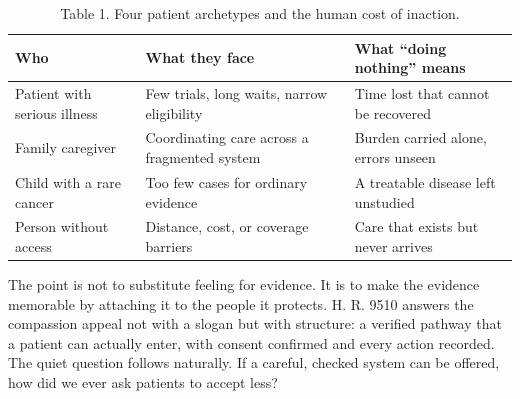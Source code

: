 \begin{table}[H]
\footnotesize
\begin{tabularx}{\textwidth}{@{}L{3.2cm} Y L{4.2cm}@{}}
\toprule
\textbf{Who} & \textbf{What they face} & \textbf{What ``doing nothing'' means}\\
\midrule
Patient with serious illness & Few trials, long waits, narrow eligibility & Time lost that cannot be recovered\\
Family caregiver & Coordinating care across a fragmented system & Burden carried alone, errors unseen\\
Child with a rare cancer & Too few cases for ordinary evidence & A treatable disease left unstudied\\
Person without access & Distance, cost, or coverage barriers & Care that exists but never arrives\\
\bottomrule
\end{tabularx}
\caption{Table 1. Four patient archetypes and the human cost of inaction.}
\label{tab:compassion}
\end{table}

The point is not to substitute feeling for evidence. It is to make the evidence
memorable by attaching it to the people it protects. H. R. 9510 answers the
compassion appeal not with a slogan but with structure: a verified pathway that a
patient can actually enter, with consent confirmed and every action recorded. The
quiet question follows naturally. If a careful, checked system can be offered, how
did we ever ask patients to accept less?
